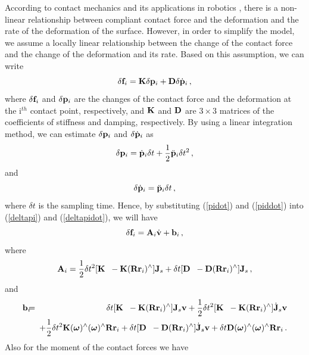 According to contact mechanics \cite{Johnson77} and its applications in
robotics \cite{Azad&Featherstone10, Azad&Featherstone14a, Hunt&Crossley75,
  Marhefka&Orin99}, there is a non-linear relationship between compliant
contact force and the deformation and the rate of the deformation of the
surface.  However, in order to simplify the model, we assume a locally linear
relationship between the change of the contact force and the change of the
deformation and its rate.  Based on this assumption, we can write
%
\begin{equation}
  \delta \mathbf{f}_i = \mathbf{K} \delta \mathbf{p}_i + \mathbf{D} \delta \dot{\mathbf{p}}_i \, ,
\end{equation}
%
where $\delta \mathbf{f}_i$ and $\delta \mathbf{p}_i$ are the changes of the contact force
and the deformation at the i$^{th}$ contact point, respectively, and $\mathbf{K}$ and
$\mathbf{D}$ are $3 \times 3$ matrices of the coefficients of stiffness and damping,
respectively.  By using a linear integration method, we can estimate $\delta
\mathbf{p}_i$ and $\delta \dot{\mathbf{p}}_i$ as
%
\begin{equation}
  \delta \mathbf{p}_i = \dot{\mathbf{p}}_i \delta t + \frac{1}{2} \ddot{\mathbf{p}}_i \delta t^2 \,
  ,
  \label{deltapi}
\end{equation}
%
and
%
\begin{equation}
  \delta \dot{\mathbf{p}}_i = \ddot{\mathbf{p}}_i \delta t \, ,
  \label{deltapidot}
\end{equation}
%
where $\delta t$ is the sampling time.  Hence, by substituting (\ref{pidot})
and (\ref{piddot}) into (\ref{deltapi}) and (\ref{deltapidot}), we will have
%
\begin{equation}
  \delta \mathbf{f}_i = \mathbf{A}_i \dot{\mathbf{v}} + \mathbf{b}_i \, ,
\end{equation}
%
where
%
%
\begin{equation}
  \mathbf{A}_i = \frac{1}{2} \delta t^2 [\mathbf{K} \; \; -\mathbf{K}(\mathbf{R} \mathbf{r}_i)^{\wedge}] \mathbf{J}_s +
  \delta t [\mathbf{D} \; \; - \mathbf{D}(\mathbf{R} \mathbf{r}_i)^{\wedge}] \mathbf{J}_s \, ,
\end{equation}
%
and
%
\begin{eqnarray}
  \nonumber \mathbf{b}_i & \!\!\!=\!\!\! & \delta t [\mathbf{K} \; \; -\mathbf{K}(\mathbf{R} \mathbf{r}_i)^{\wedge}] \mathbf{J}_s
  \mathbf{v} + \frac{1}{2} \delta t^2 [\mathbf{K} \; \; -\mathbf{K}(\mathbf{R} \mathbf{r}_i)^{\wedge}]
  \dot{\mathbf{J}}_s \mathbf{v}\\ & & + \frac{1}{2} \delta t^2 \mathbf{K} (\boldsymbol{\omega})^{\wedge}
  (\boldsymbol{\omega})^{\wedge} \mathbf{R} \mathbf{r}_i + \delta t [\mathbf{D} \; \; -\mathbf{D}(\mathbf{R} \mathbf{r}_i)^{\wedge}]
  \dot{\mathbf{J}}_s \mathbf{v} + \delta t \mathbf{D} (\boldsymbol{\omega})^{\wedge} (\boldsymbol{\omega})^{\wedge} \mathbf{R}
  \mathbf{r}_i \, .
\end{eqnarray}
%
Also for the moment of the contact forces we have
